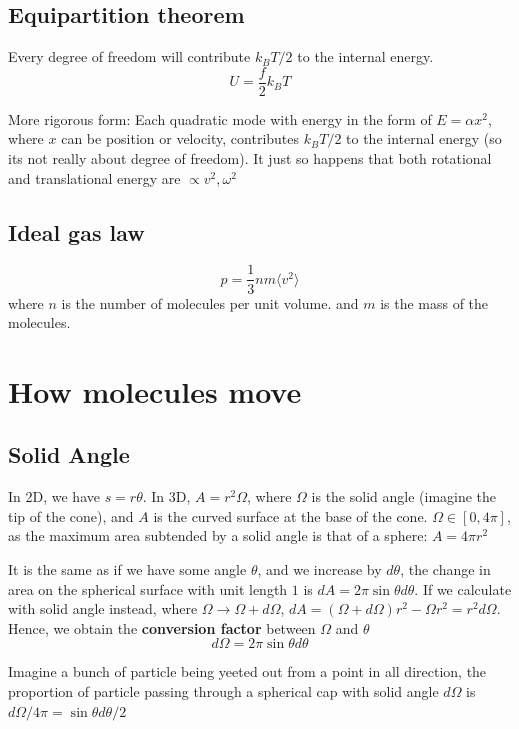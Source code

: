\subsection{Equipartition theorem}
Every degree of freedom will contribute $k_B T/2$ to the internal energy. 
\begin{equation}
    U=\frac{f}{2}k_BT
\end{equation}

More rigorous form: Each quadratic mode with energy in the form of $E=\alpha x^2$, where $x$ can be position or velocity, contributes $k_BT/2$ to the internal energy (so its not really about degree of freedom). It just so happens that both rotational and translational energy are $\propto v^2, \omega^2$

\subsection{Ideal gas law}
\begin{equation}
    p=\frac{1}{3}n m \langle v^2 \rangle
\end{equation}
where $n$ is the number of molecules per unit volume. and $m$ is the mass of the molecules.

\section{How molecules move}
\subsection{Solid Angle}
In 2D, we have $s=r\theta$. In 3D, $A=r^2 \Omega$, where $\Omega$ is the solid angle (imagine the tip of the cone), and $A$ is the curved surface at the base of the cone. $\Omega \in [0,4\pi]$, as the maximum area subtended by a solid angle is that of a sphere: $A=4\pi r^2$

It is the same as if we have some angle $\theta$, and we increase by $d\theta$, the change in area on the spherical surface with unit length $1$ is $dA= 2\pi \sin \theta d\theta$. If we calculate with solid angle instead, where $\Omega \to \Omega + d\Omega$, $dA=(\Omega + d\Omega)r^2-\Omega r^2 = r^2 d \Omega$.
Hence, we obtain the \textbf{conversion factor} between $\Omega$ and $\theta$
\begin{equation}
    d\Omega=2\pi \sin \theta d\theta
\end{equation}

Imagine a bunch of particle being yeeted out from a point in all direction, the proportion of particle passing through a spherical cap with solid angle $d\Omega$ is $d\Omega/4\pi = \sin \theta d\theta/2$

